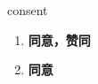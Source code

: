
\begin{frame}
{\huge consent}
\begin{center}
\begin{enumerate}\Large
  \item \textbf{同意，赞同}
  \item \textbf{同意}
\end{enumerate}
\end{center}
\end{frame}
